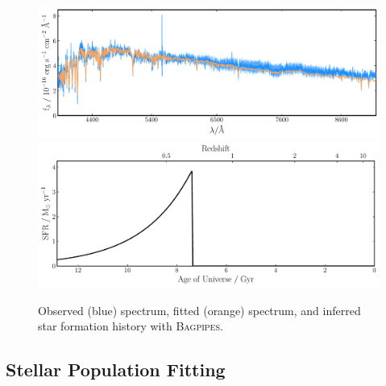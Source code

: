 \documentclass[a4paper,11pt]{article}
\begin{document}
\begin{figure}
  \includegraphics[width=\textwidth]{host_hyz_specwerr_fit}
  \includegraphics[width=\textwidth]{host_hyz_specwerr_sfh}
  \caption{Observed (blue) spectrum, fitted (orange) spectrum, and inferred star formation history with \textsc{Bagpipes}.}
  \label{fig:bagpipes_example_fit}
\end{figure}

\subsection{Stellar Population Fitting}\label{sec:stellar_population_fitting}
\end{document}
